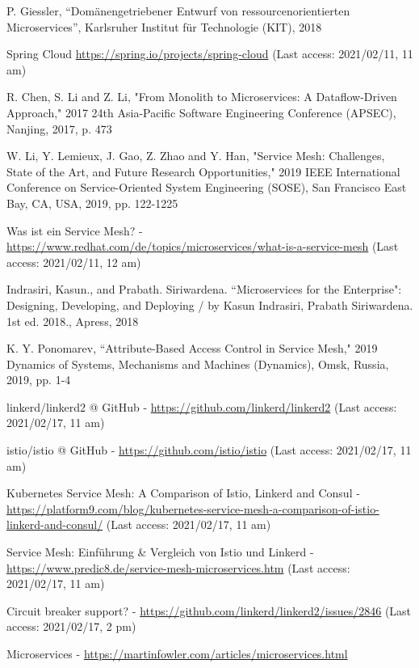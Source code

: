 \begin{thebibliography}{00}

 P. Giessler, ``Dom\"anengetriebener Entwurf von ressourcenorientierten Microservices'', Karlsruher Institut für Technologie (KIT), 2018

Spring Cloud \url{https://spring.io/projects/spring-cloud} (Last access: 2021/02/11, 11 am)

 R. Chen, S. Li and Z. Li, "From Monolith to Microservices: A Dataflow-Driven Approach," 2017 24th Asia-Pacific Software Engineering Conference (APSEC), Nanjing, 2017, p. 473

 W. Li, Y. Lemieux, J. Gao, Z. Zhao and Y. Han, "Service Mesh: Challenges, State of the Art, and Future Research Opportunities," 2019 IEEE International Conference on Service-Oriented System Engineering (SOSE), San Francisco East Bay, CA, USA, 2019, pp. 122-1225

 Was ist ein Service Mesh? - \url{https://www.redhat.com/de/topics/microservices/what-is-a-service-mesh} (Last access: 2021/02/11, 12 am)

 Indrasiri, Kasun., and Prabath. Siriwardena. ``Microservices for the Enterprise": Designing, Developing, and Deploying / by Kasun Indrasiri, Prabath Siriwardena. 1st ed. 2018., Apress, 2018

K. Y. Ponomarev, ``Attribute-Based Access Control in Service Mesh," 2019 Dynamics of Systems, Mechanisms and Machines (Dynamics), Omsk, Russia, 2019, pp. 1-4

 linkerd/linkerd2 @ GitHub - \url{https://github.com/linkerd/linkerd2} (Last access: 2021/02/17, 11 am)

 istio/istio @ GitHub - \url{https://github.com/istio/istio} (Last access: 2021/02/17, 11 am)

 Kubernetes Service Mesh: A Comparison of Istio, Linkerd and Consul - \url{https://platform9.com/blog/kubernetes-service-mesh-a-comparison-of-istio-linkerd-and-consul/} (Last access: 2021/02/17, 11 am)

 Service Mesh: Einführung \& Vergleich von Istio und Linkerd - \url{https://www.predic8.de/service-mesh-microservices.htm}  (Last access: 2021/02/17, 11 am)

 Circuit breaker support? - \url{https://github.com/linkerd/linkerd2/issues/2846} (Last access: 2021/02/17, 2 pm)

 Microservices - \url{https://martinfowler.com/articles/microservices.html}

\end{thebibliography}